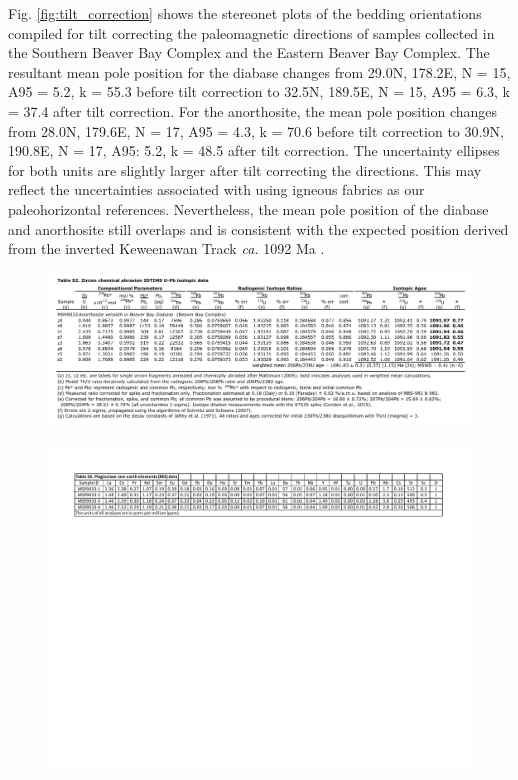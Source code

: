 Fig. \ref{fig:tilt_correction} shows the stereonet plots of the bedding orientations compiled for tilt correcting the paleomagnetic directions of samples collected in the Southern Beaver Bay Complex and the Eastern Beaver Bay Complex. The resultant mean pole position for the diabase changes from 29.0\textdegree N, 178.2\textdegree E, N = 15, A95 = 5.2\textdegree, k = 55.3 before tilt correction to 32.5\textdegree N, 189.5\textdegree E, N = 15, A95 = 6.3\textdegree, k = 37.4 after tilt correction. For the anorthosite, the mean pole position changes from 28.0\textdegree N, 179.6\textdegree E, N = 17, A95 = 4.3\textdegree, k = 70.6 before tilt correction to 30.9\textdegree N, 190.8\textdegree E, N = 17, A95: 5.2\textdegree, k = 48.5 after tilt correction. The uncertainty ellipses for both units are slightly larger after tilt correcting the directions. This may reflect the uncertainties associated with using igneous fabrics as our paleohorizontal references. Nevertheless, the mean pole position of the diabase and anorthosite still overlaps and is consistent with the expected position derived from the inverted Keweenawan Track \textit{ca.} 1092 Ma \citep{Swanson-Hysell2019a}. 


\vspace{1in}

\begin{figure}[h!]
\noindent\includegraphics[width=\textwidth]{figure/Zhang2021/SI_MS99033_geochron.pdf}
\centering
\end{figure}

\vspace{1in}

\begin{figure}[h!]
\noindent\includegraphics[width=\textwidth]{figure/Zhang2021/SI_plag_REE_table.pdf}
\centering
\end{figure}

\nocite{Mattinson2005a, Condon2015a, Schmitz2007a, Jaffe1975a}

\clearpage

